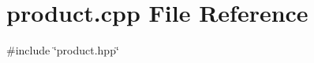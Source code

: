 \section{product.\+cpp File Reference}
\label{product_8cpp}
{\ttfamily \#include \char`\"{}product.\+hpp\char`\"{}}\newline
